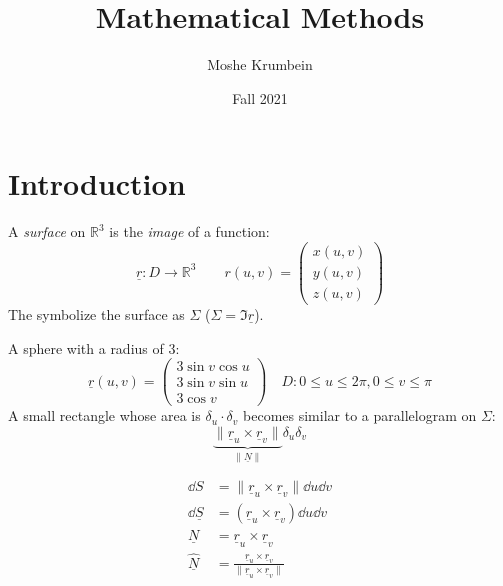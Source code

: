 \documentclass[00_complete]{subfiles}
\title{Mathematical Methods}
\author{Moshe Krumbein}
\date{Fall 2021}
\begin{document}
\section{Introduction}

\begin{reminder}
    A \emph{surface} on $\mathbb{R}^3$ is the \emph{image} of a function:
        $$\underline r: D\to \mathbb{R}^3 \qquad r(u,v)=\begin{pmatrix}
            x(u,v) \\ y(u,v) \\ z(u,v)
        \end{pmatrix}$$
    The symbolize the surface as $\Sigma$ ($\Sigma = \Im \underline r$).
\end{reminder}
\begin{example}
    A sphere with a radius of $3$:
    $$\underline r (u,v) = \begin{pmatrix}
        3 \sin v \cos u \\ 3 \sin v \sin u \\ 3 \cos v
    \end{pmatrix} \quad D: 0 \leq u \leq 2\pi, 0 \leq v \leq \pi$$
    A small rectangle whose area is $\delta_u \cdot \delta_v$ becomes similar
    to a parallelogram on $\Sigma$:
    $$\underbrace{\|\underline r_u \times \underline r_v\|}_{\|\underline N\|}\delta_u\delta_v$$
\end{example}
\begin{symbols}
    \begin{align*}
        \dd{S}&=\|\underline r_u \times \underline r_v\|\dd{u}\dd{v} \\
        \dd{\underline S} &= (\underline r_u \times \underline r_v)\dd{u}\dd{v}
        \\
        \underline N &= \underline r_u \times \underline r_v \\
        \underline{\hat N} &= \frac{\underline r_u \times \underline
        r_v}{\|\underline r_u \times \underline r_v\|} \\
    \end{align*}
\end{symbols}
\end{document}

